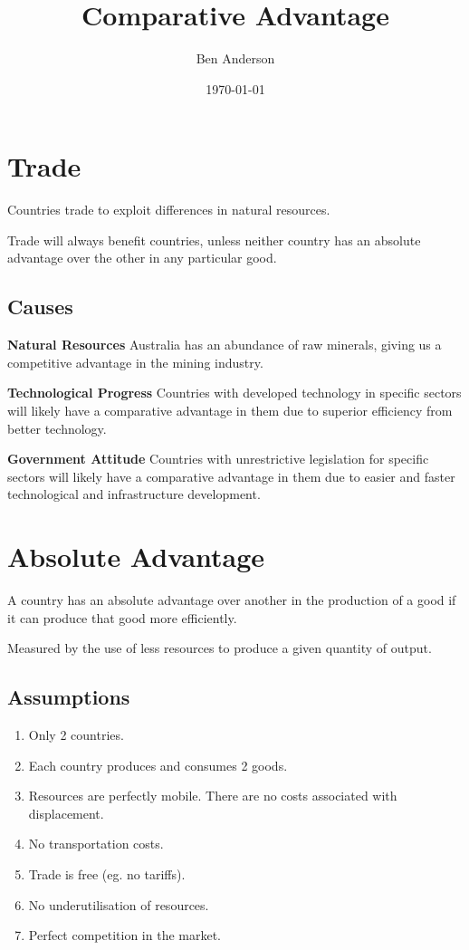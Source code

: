 \documentclass[a4paper,11pt]{article}
\begin{document}
\title{Comparative Advantage}
\author{Ben Anderson}
\date{\today}
\maketitle
\pagebreak

\tableofcontents
\pagebreak



\section{Trade}

Countries trade to exploit differences in natural resources.

Trade will always benefit countries, unless neither country has an absolute
advantage over the other in any particular good.


\subsection{Causes}

\textbf{Natural Resources} \quad Australia has an abundance of raw minerals,
giving us a competitive advantage in the mining industry.

\textbf{Technological Progress} \quad Countries with developed technology in
specific sectors will likely have a comparative advantage in them due to
superior efficiency from better technology.

\textbf{Government Attitude} \quad Countries with unrestrictive legislation for
specific sectors will likely have a comparative advantage in them due to easier
and faster technological and infrastructure development.




\section{Absolute Advantage}

A country has an absolute advantage over another in the production of a good if
it can produce that good more efficiently.

Measured by the use of less resources to produce a given quantity of output.


\subsection{Assumptions}

\begin{enumerate}
\item Only 2 countries.
\item Each country produces and consumes 2 goods.
\item Resources are perfectly mobile. There are no costs associated with
displacement.
\item No transportation costs.
\item Trade is free (eg. no tariffs).
\item No underutilisation of resources.
\item Perfect competition in the market.
\end{enumerate}
\end{document}
